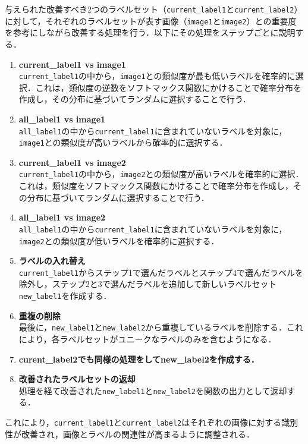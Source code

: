 \documentclass[a4paper,11pt]{jreport}
\begin{document}
与えられた改善すべき2つのラベルセット（\texttt{current\_label1}と\texttt{current\_label2}）に対して，それぞれのラベルセットが表す画像（\texttt{image1}と\texttt{image2}）との重要度を参考にしながら改善する処理を行う．以下にその処理をステップごとに説明する．

\begin{enumerate}
    \item \textbf{current\_label1 vs image1}\\
    \texttt{current\_label1}の中から，\texttt{image1}との類似度が最も低いラベルを確率的に選択．これは，類似度の逆数をソフトマックス関数にかけることで確率分布を作成し，その分布に基づいてランダムに選択することで行う．
    \item \textbf{all\_label1 vs image1}\\
    \texttt{all\_label1}の中から\texttt{current\_label1}に含まれていないラベルを対象に，\texttt{image1}との類似度が高いラベルから確率的に選択する．
    \item \textbf{current\_label1 vs image2}\\
    \texttt{current\_label1}の中から，\texttt{image2}との類似度が高いラベルを確率的に選択．これは，類似度をソフトマックス関数にかけることで確率分布を作成し，その分布に基づいてランダムに選択することで行う．
    \item \textbf{all\_label1 vs image2}\\
    \texttt{all\_label1}の中から\texttt{current\_label1}に含まれていないラベルを対象に，\texttt{image2}との類似度が低いラベルを確率的に選択する．
    \item \textbf{ラベルの入れ替え}\\
    \texttt{current\_label1}からステップ1で選んだラベルとステップ4で選んだラベルを除外し，ステップ2と3で選んだラベルを追加して新しいラベルセット\texttt{new\_label1}を作成する．
    \item \textbf{重複の削除}\\
    最後に，\texttt{new\_label1}と\texttt{new\_label2}から重複しているラベルを削除する．これにより，各ラベルセットがユニークなラベルのみを含むようになる．
    \item \textbf{curent\_label2でも同様の処理をしてnew\_label2を作成する．}
    \item \textbf{改善されたラベルセットの返却}\\
    処理を経て改善された\texttt{new\_label1}と\texttt{new\_label2}を関数の出力として返却する．
\end{enumerate}
これにより，\texttt{current\_label1}と\texttt{current\_label2}はそれぞれの画像に対する識別性が改善され，画像とラベルの関連性が高まるように調整される．
\end{document}
